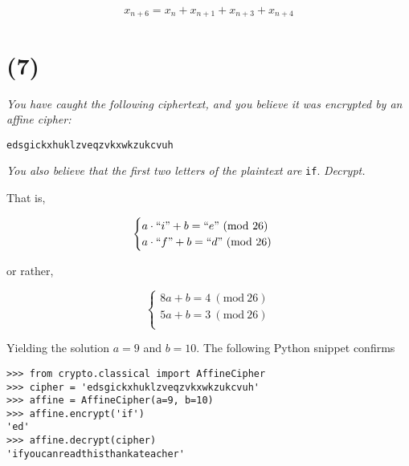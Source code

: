 \documentclass[12pt]{article}
\renewcommand{\mod}[1]{\mathrm{mod}\ #1}
\renewcommand{\pmod}[1]{\ (\mod{#1})}
\begin{document}
$$ x_{n + 6} = x_n + x_{n + 1} + x_{n + 3} + x_{n + 4}$$

\section*{(7)} \textit{You have caught the following ciphertext, and you believe it was encrypted by an affine cipher:}

\begin{center}
\texttt{edsgickxhuklzveqzvkxwkzukcvuh}
\end{center}

\noindent\textit{You also believe that the first two letters of the plaintext are} \texttt{if}. \textit{Decrypt.}

That is,

$$\begin{cases}
a \cdot ``i" + b = ``e" \pmod{26}\\
a \cdot ``f" + b = ``d" \pmod{26}\\
\end{cases}$$

or rather,

$$\begin{cases}
8a + b = 4 \pmod{26}\\
5a + b = 3 \pmod{26}\\
\end{cases}$$

Yielding the solution $a = 9$ and $b = 10$. The following Python snippet confirms

\begin{verbatim}
>>> from crypto.classical import AffineCipher
>>> cipher = 'edsgickxhuklzveqzvkxwkzukcvuh'
>>> affine = AffineCipher(a=9, b=10)
>>> affine.encrypt('if')
'ed'
>>> affine.decrypt(cipher)
'ifyoucanreadthisthankateacher'
\end{verbatim}
\end{document}
